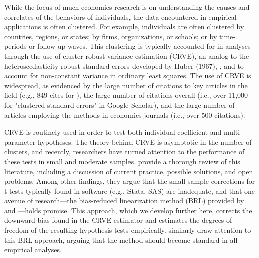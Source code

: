 \documentclass[12pt]{article}\usepackage[]{graphicx}\usepackage[]{color}
\begin{document}
While the focus of much economics research is on understanding the causes and correlates of the behaviors of individuals, the data encountered in empirical applications is often clustered. 
For example, individuals are often clustered by countries, regions, or states; by firms, organizations, or schools; or by time-periods or follow-up waves. 
This clustering is typically accounted for in analyses through the use of cluster robust variance estimation (CRVE), an analog to the heteroscedasticity robust standard errors developed by Huber (1967), \citet{eicker1967limit}, and \citet{White1980heteroskedasticity} to account for non-constant variance in ordinary least squares. 
The use of CRVE is widespread, as evidenced by the large number of citations to key articles in the field (e.g., 849 cites for \citealp{Wooldridge2003cluster}), the large number of citations overall (i.e., over 11,000 for "clustered standard errors" in Google Scholar), and the large number of articles employing the methods in economics journals (i.e., over 500 citations). 

CRVE is routinely used in order to test both individual coefficient and multi-parameter hypotheses. 
The theory behind CRVE is asymptotic in the number of clusters, and recently, researchers have turned attention to the performance of these tests in small and moderate samples. 
\citet{Cameron2015practitioners} provide a thorough review of this literature, including a discussion of current practice, possible solutions, and open problems. 
Among other findings, they argue that the small-sample corrections for t-tests typically found in software (e.g., Stata, SAS) are inadequate, and that one avenue of research---the bias-reduced linearization method (BRL) provided by \citet{Bell2002bias} and \citet{McCaffrey2001generalizations}---holds promise. 
This approach, which we develop further here, corrects the downward bias found in the CRVE estimator and estimates the degrees of freedom of the resulting hypothesis tests empirically. 
\citet{Imbens2012robust} similarly draw attention to this BRL approach, arguing that the method should become standard in all empirical analyses.
\end{document}
